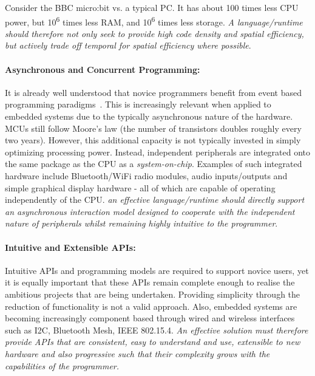 Consider the BBC micro:bit vs. a typical PC. It has about 100 times less CPU power, but 10\textsuperscript{6} times less RAM, and 10\textsuperscript{6} times less storage. \emph{A language/runtime should therefore not only seek to provide high code density and spatial efficiency, but actively trade off temporal for spatial efficiency where possible}.

\paragraph{Asynchronous and Concurrent Programming:}
It is already well understood that novice programmers benefit from  event based programming paradigms~\cite{maloney2008programming,maloney2010scratch,turbak2014events}. This is increasingly relevant when applied to embedded systems due to the typically asynchronous nature of the hardware. MCUs still follow Moore's law (the number of transistors doubles roughly every two years). However, this additional capacity is not typically invested in simply optimizing processing power. Instead, independent peripherals are integrated onto the same package as the CPU as a \emph{system-on-chip}. Examples  of such integrated hardware include Bluetooth/WiFi radio modules, audio inputs/outputs and simple graphical display hardware - all of which are capable of operating independently of the CPU. \emph{an effective language/runtime should directly support an asynchronous interaction model designed to cooperate with the independent nature of peripherals whilst remaining highly intuitive to the programmer}.

\paragraph{Intuitive and Extensible APIs:}
Intuitive APIs and programming models are required to support novice users, yet it is equally important that these APIs remain complete enough to realise the ambitious projects that are being undertaken. Providing simplicity through the reduction of functionality is not a valid approach. Also, embedded systems are becoming increasingly component based through wired and wireless interfaces such as I2C, Bluetooth Mesh, IEEE 802.15.4. \emph{An effective solution must therefore provide APIs that are consistent, easy to understand and use, extensible to new hardware and also progressive such that their complexity grows with the capabilities of the programmer.}

